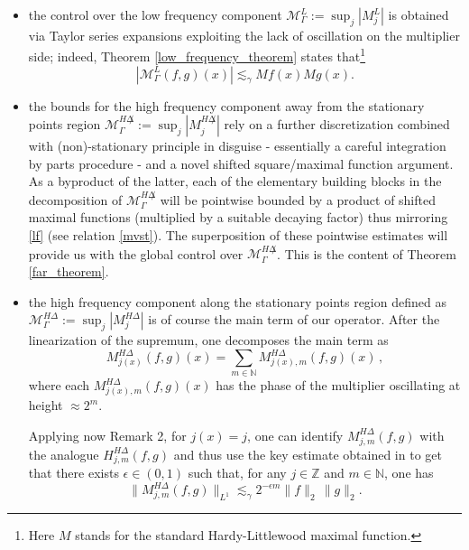 \documentclass{amsart}
\newcommand{\Z}{\mathbb{Z}}
\newcommand{\N}{\mathbb{N}}
\newcommand{\M}{\mathcal{M}}
\theoremstyle{definition}
\theoremstyle{remark}
\numberwithin{equation}{section}
\begin{document}
\begin{itemize}
\item the control over the low frequency component $\M^L_\Gamma:=\sup_j |M_j^L|$ is obtained via Taylor series expansions exploiting the lack of oscillation on the multiplier side; indeed, Theorem \ref{low_frequency_theorem} states that\footnote{Here $M$ stands for the standard Hardy-Littlewood maximal function.}
\begin{equation}\label{lf}
 |\M_\Gamma^L(f,g)(x)|\lesssim_\gamma Mf(x)Mg(x).
\end{equation}

\item the bounds for the high frequency component away from the stationary points region $\M^{H\not\Delta}_\Gamma:=\sup_{j} |M_j^{H\not\Delta}|$ rely on a further discretization combined with (non)-stationary principle in disguise - essentially a careful integration by parts procedure - and a novel shifted square/maximal function argument. As a byproduct of the latter, each of the elementary building blocks in the decomposition of $\M^{H\not\Delta}_\Gamma$ will be pointwise bounded by a product of shifted maximal functions (multiplied by a suitable decaying factor) thus mirroring \eqref{lf} (see relation \eqref{mvst}). The superposition of these pointwise estimates will provide us with the global control over $\M^{H\not\Delta}_\Gamma$.
     This is the content of Theorem \ref{far_theorem}.

\item the high frequency component along the stationary points region defined as $\M^{H\Delta}_\Gamma:=\sup_{j}| M_j^{H\Delta}|$ is of course the main term of our operator. After the linearization of the supremum, one decomposes the main term as
 \begin{equation}\label{decm}
 M_{j(x)}^{H\Delta}(f,g)(x)=\sum_{m\in\N}  M_{j(x),m}^{H\Delta}(f,g)(x)\,,
\end{equation}
where each $M_{j(x),m}^{H\Delta}(f,g)(x)$ has the phase of the multiplier oscillating at height $\approx2^m$.

Applying now Remark 2, for $j(x)=j$, one can identify $M_{j,m}^{H\Delta}(f,g)$ with the analogue $H_{j,m}^{H\Delta}(f,g)$ and thus use the key estimate obtained in \cite[Theorem 3]{lie2015boundedness} to get that there exists $\epsilon\in(0,1)$ such that, for any $j\in \Z$ and $m\in\N$, one has
\begin{equation}\label{l2cs}
 \|M^{H\Delta}_{j,m}(f,g)\|_{L^1}\lesssim_{\gamma} 2^{-\epsilon m}\|f\|_2\,\|g\|_{2}.
\end{equation}


\end{itemize}
\end{document}
